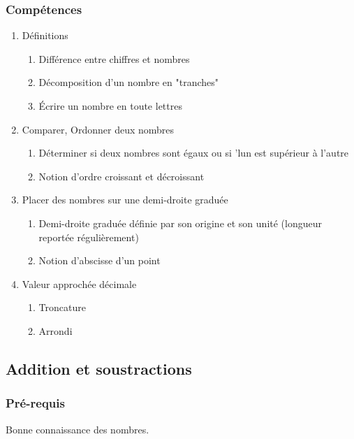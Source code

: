 \subsubsection*{Compétences}
\begin{enumerate}
	\item Définitions
		\begin{enumerate}
			\item Différence entre chiffres et nombres
			\item Décomposition d'un nombre en "tranches"
			\item \'Ecrire un nombre en toute lettres
		\end{enumerate}
	\item Comparer, Ordonner deux nombres
		\begin{enumerate}
			\item Déterminer si deux nombres sont égaux ou si 'lun est supérieur à l'autre
			\item Notion d'ordre croissant et décroissant
		\end{enumerate}
	\item Placer des nombres sur une demi-droite graduée
		\begin{enumerate}
			\item Demi-droite graduée définie par son origine et son unité (longueur reportée régulièrement)
			\item Notion d'abscisse d'un point
		\end{enumerate}
	\item Valeur approchée décimale
		\begin{enumerate}
			\item Troncature
			\item Arrondi
		\end{enumerate}
	
\end{enumerate}


\subsection{Addition et soustractions}\label{ch_6_add}

\subsubsection*{Pré-requis}

Bonne connaissance des nombres.


